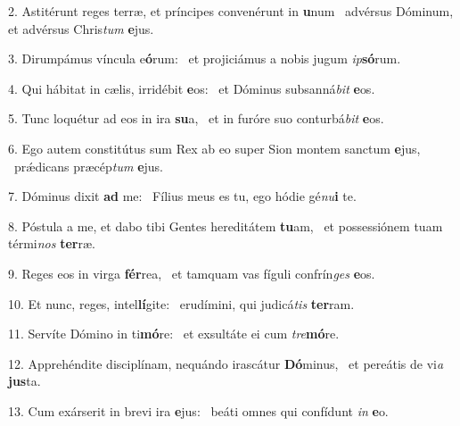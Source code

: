 2. Astitérunt reges terræ, et príncipes convenérunt in \textbf{u}num \ast\  advérsus Dóminum, et advérsus Chris\textit{tum} \textbf{e}jus.\

3. Dirumpámus víncula e\textbf{ó}rum: \ast\  et projiciámus a nobis jugum \textit{ip}\textbf{só}rum.\

4. Qui hábitat in cælis, irridébit \textbf{e}os: \ast\  et Dóminus subsanná\textit{bit} \textbf{e}os.\

5. Tunc loquétur ad eos in ira \textbf{su}a, \ast\  et in furóre suo conturbá\textit{bit} \textbf{e}os.\

6. Ego autem constitútus sum Rex ab eo super Sion montem sanctum \textbf{e}jus, \ast\  prǽdicans præcép\textit{tum} \textbf{e}jus.\

7. Dóminus dixit \textbf{ad} me: \ast\  Fílius meus es tu, ego hódie gé\textit{nu}\textbf{i} te.\

8. Póstula a me, et dabo tibi Gentes hereditátem \textbf{tu}am, \ast\  et possessiónem tuam térmi\textit{nos} \textbf{ter}ræ.\

9. Reges eos in virga \textbf{fér}rea, \ast\  et tamquam vas fíguli confrín\textit{ges} \textbf{e}os.\

10. Et nunc, reges, intel\textbf{lí}gite: \ast\  erudímini, qui judicá\textit{tis} \textbf{ter}ram.\

11. Servíte Dómino in ti\textbf{mó}re: \ast\  et exsultáte ei cum \textit{tre}\textbf{mó}re.\

12. Apprehéndite disciplínam, nequándo irascátur \textbf{Dó}minus, \ast\  et pereátis de vi\textit{a} \textbf{jus}ta.\

13. Cum exárserit in brevi ira \textbf{e}jus: \ast\  beáti omnes qui confídunt \textit{in} \textbf{e}o.\

